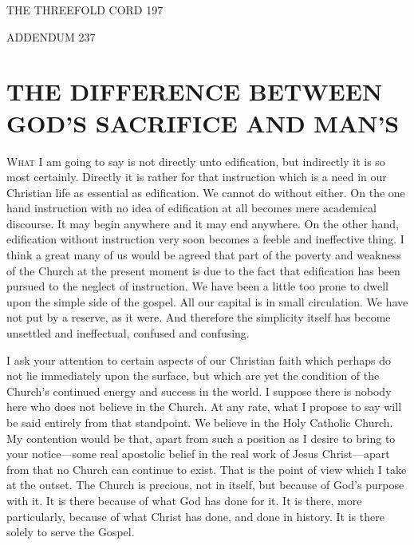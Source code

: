 \documentclass[12pt,letterpaper,oneside]{book}
\begin{document}
THE THREEFOLD CORD 197 



ADDENDUM 237 




\chapter{THE DIFFERENCE BETWEEN 
GOD'S SACRIFICE AND MAN'S} 







\textsc{What} I am going to say is not directly unto 
edification, but indirectly it is so most 
certainly. Directly it is rather for that instruction 
which is a need in our Christian life as 
essential as edification. We cannot do without 
either. On the one hand instruction with no idea 
of edification at all becomes mere academical 
discourse. It may begin anywhere and it may 
end anywhere. On the other hand, edification 
without instruction very soon becomes a feeble 
and ineffective thing. I think a great many of 
us would be agreed that part of the poverty 
and weakness of the Church at the present 
moment is due to the fact that edification has 
been pursued to the neglect of instruction. We 
have been a little too prone to dwell upon the 
simple side of the gospel. All our capital is in
small circulation. We have not put by a reserve, 
as it were. And therefore the simplicity 
itself has become unsettled and ineffectual, confused 
and confusing. 

I ask your attention to certain aspects of 
our Christian faith which perhaps do not lie 
immediately upon the surface, but which are 
yet the condition of the Church's continued 
energy and success in the world. I suppose there 
is nobody here who does not believe in the 
Church. At any rate, what I propose to say 
will be said entirely from that standpoint. We 
believe in the Holy Catholic Church. My contention 
would be that, apart from such a position 
as I desire to bring to your notice---some 
real apostolic belief in the real work of Jesus 
Christ---apart from that no Church can continue 
to exist. That is the point of view which I take 
at the outset. The Church is precious, not in 
itself, but because of God's purpose with it. It 
is there because of what God has done for it. 
It is there, more particularly, because of what 
Christ has done, and done in history. It is 
there solely to serve the Gospel. 
\end{document}
